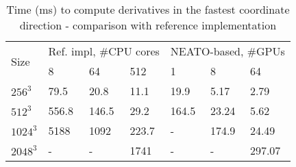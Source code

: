\begin{table}[]
\centering
\caption{Time (ms) to compute derivatives in the fastest coordinate direction -
    comparison with reference implementation \cite{mohd2010adapting}}
\label{table:compact-refimpl-timings}
\begin{tabular}{|l|l|l|l|l|l|l|}
\hline
\multirow{2}{*}{Size} & \multicolumn{3}{c|}{Ref. impl, \#CPU cores} & \multicolumn{3}{c|}{NEATO-based, \#GPUs} \\ \cline{2-7}
         & 8         & 64        & 512      & 1       & 8       & 64      \\ \hline
$256^3$  & 79.5      & 20.8      & 11.1     & 19.9    & 5.17    & 2.79    \\ \hline
$512^3$  & 556.8     & 146.5     & 29.2     & 164.5   & 23.24   & 5.62    \\ \hline
$1024^3$ & 5188      & 1092      & 223.7    & -       & 174.9   & 24.49   \\ \hline
$2048^3$ & -         & -         & 1741     & -       & -       & 297.07  \\ \hline
\end{tabular}
\end{table}
